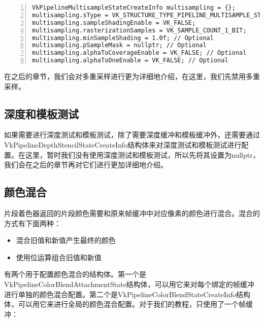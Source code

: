\documentclass{ctexart}
\begin{document}
\begin{lstlisting}[language={[ANSI]C},keywordstyle=\color{blue!70},commentstyle=\color{red!50!green!50!blue!50},frame=shadowbox, rulesepcolor=\color{red!20!green!20!blue!20},basicstyle=\small,numbers=left, numberstyle=\tiny,breaklines=true]
VkPipelineMultisampleStateCreateInfo multisampling = {};
multisampling.sType = VK_STRUCTURE_TYPE_PIPELINE_MULTISAMPLE_STATE_CREATE_INFO;
multisampling.sampleShadingEnable = VK_FALSE;
multisampling.rasterizationSamples = VK_SAMPLE_COUNT_1_BIT;
multisampling.minSampleShading = 1.0f; // Optional
multisampling.pSampleMask = nullptr; // Optional
multisampling.alphaToCoverageEnable = VK_FALSE; // Optional
multisampling.alphaToOneEnable = VK_FALSE; // Optional
\end{lstlisting}

在之后的章节，我们会对多重采样进行更为详细地介绍，在这里，我们先禁用多重采样。

\subsection{深度和模板测试}

如果需要进行深度测试和模板测试，除了需要深度缓冲和模板缓冲外，还需要通过VkPipelineDepthStencilStateCreateInfo结构体来对深度测试和模板测试进行配置。在这里，暂时我们没有使用深度测试和模板测试，所以先将其设置为nullptr，我们会在之后的章节再对它们进行更加详细地介绍。

\subsection{颜色混合}

片段着色器返回的片段颜色需要和原来帧缓冲中对应像素的颜色进行混合。混合的方式有下面两种：

\begin{itemize}
	\item 混合旧值和新值产生最终的颜色
	\item 使用位运算组合旧值和新值
\end{itemize}

有两个用于配置颜色混合的结构体。第一个是VkPipelineColorBlendAttachmentState结构体，可以用它来对每个绑定的帧缓冲进行单独的颜色混合配置。第二个是VkPipelineColorBlendStateCreateInfo结构体，可以用它来进行全局的颜色混合配置。对于我们的教程，只使用了一个帧缓冲：
\end{document}
